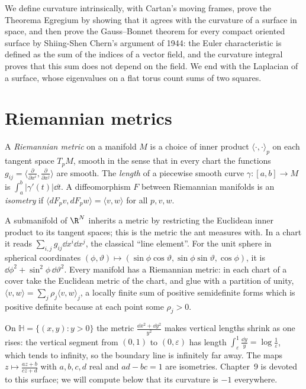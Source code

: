 We define curvature intrinsically, with Cartan's moving frames, prove the Theorema Egregium by showing that it agrees with the curvature of a surface in
space, and then prove the Gauss--Bonnet theorem for every compact oriented surface by Shiing-Shen Chern's argument of 1944: the Euler characteristic is
defined as the sum of the indices of a vector field, and the curvature integral proves that this sum does not depend on the field. We end with the
Laplacian of a surface, whose eigenvalues on a flat torus count sums of two squares.

\section{Riemannian metrics}

\begin{definition}
A \emph{Riemannian metric} on a manifold $M$ is a choice of inner product $\langle\cdot,\cdot\rangle_p$ on each tangent space $T_pM$, smooth in the sense that in
every chart the functions $g_{ij}=\langle\frac\partial{\partial x^i},\frac\partial{\partial x^j}\rangle$ are smooth. The \emph{length} of a piecewise smooth curve
$\gamma\colon[a,b]\to M$ is $\int_a^b|\gamma'(t)|\dd t$. A diffeomorphism $F$ between Riemannian manifolds is an \emph{isometry} if $\langle dF_pv,dF_pw\rangle=\langle v,w\rangle$ for all
$p,v,w$.
\end{definition}

A submanifold of $\R^N$ inherits a metric by restricting the Euclidean inner product to its tangent spaces; this is the metric the ant measures with. In a
chart it reads $\sum_{i,j}g_{ij}\dd x^i\dd x^j$, the classical ``line element''. For the unit sphere in spherical coordinates
$(\phi,\vartheta)\mapsto(\sin\phi\cos\vartheta,\sin\phi\sin\vartheta,\cos\phi)$, it is $\dd\phi^2+\sin^2\phi\,\dd\vartheta^2$. Every manifold has a Riemannian metric: in each chart
of a cover take the Euclidean metric of the chart, and glue with a partition of unity, $\langle v,w\rangle=\sum_j\rho_j\langle v,w\rangle_j$, a locally finite sum of positive
semidefinite forms which is positive definite because at each point some $\rho_j>0$.

\begin{example}\label{ex:halfplane}
On $\mathbb H=\{(x,y):y>0\}$ the metric $\frac{\dd x^2+\dd y^2}{y^2}$ makes vertical lengths shrink as one rises: the vertical segment from $(0,1)$ to $(0,\varepsilon)$
has length $\int_\varepsilon^1\frac{\dd y}y=\log\frac1\varepsilon$, which tends to infinity, so the boundary line is infinitely far away. The maps
$z\mapsto\frac{az+b}{cz+d}$ with $a,b,c,d$ real and $ad-bc=1$ are isometries. Chapter~9 is devoted to this surface; we will compute below that its curvature
is $-1$ everywhere.
\end{example}

